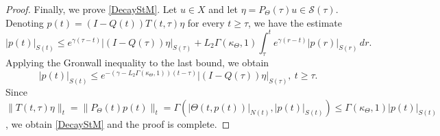 \documentclass[a4paper,11pt,reqno]{amsart}
\theoremstyle{plain}
\theoremstyle{definition}
\numberwithin{equation}{section}
\newcommand{\R}{\mathbb{R}}
\renewcommand{\geq}{\geqslant}
\renewcommand{\leq}{\leqslant}
\begin{document}
\begin{proof}


    
Finally, we prove \eqref{DecayStM}. Let $u\in X$ and let $\eta = P_\Theta(\tau)u\in \mathcal{S}(\tau)$. 
    Denoting $p(t)=(I-Q(t))T(t,\tau)\eta$ for every $t\geq \tau$, we have the estimate
    \begin{equation*}
        |p(t)|_{S(t)}\leq e^{\gamma(\tau-t)}|(I-Q(\tau))\eta|_{{S(\tau)}}
        +L_2\Gamma(\kappa_\Theta,1)
        \int_\tau^t e^{\gamma(r-t)}|p(r)|_{S(r)} \, dr.
    \end{equation*}
    Applying the Gronwall inequality 
    to the last bound, we obtain 
     \begin{equation*}%
|p(t)|_{S(t)}\leq e^{-(\gamma-L_2\Gamma(\kappa_\Theta,1))(t-\tau)}|(I-Q(\tau))\eta|_{S(\tau)}, \ t\geq \tau.
\end{equation*}
Since $\|T(t,\tau)\eta\|_t=\|P_\Theta(t)p(t)\|_t=
\Gamma(|\Theta(t,p(t))|_{N(t)},|p(t)|_{S(t)})\leq \Gamma(\kappa_\Theta,1)|p(t)|_{S(t)}$,
we obtain \eqref{DecayStM} and the proof is complete.
\end{proof}
\end{document}
